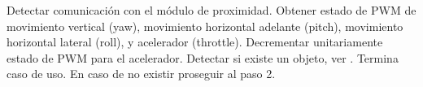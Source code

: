 \begin{UCtrayectoria}
	\UCpaso [\UCactor] Detectar comunicación con el módulo de proximidad.
	\UCpaso Obtener estado de PWM de movimiento vertical (yaw), movimiento 
	horizontal adelante (pitch), movimiento horizontal lateral (roll), 
	y acelerador (throttle).
	\UCpaso Decrementar unitariamente estado de PWM para el acelerador.
	\UCpaso Detectar si existe un objeto, ver . Termina 
	caso de uso. En caso de no existir proseguir al paso 2.
\end{UCtrayectoria}









